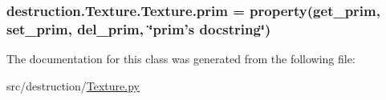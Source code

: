 \hypertarget{classdestruction_1_1_texture_1_1_texture_a5647247acd4010e891e5a0526d1a9fd5}{
\subsubsection[{prim}]{\setlength{\rightskip}{0pt plus 5cm}destruction.\-Texture.\-Texture.\-prim = property({\bf get\-\_\-prim}, {\bf set\-\_\-prim}, {\bf del\-\_\-prim}, \char`\"{}prim's docstring\char`\"{})\hspace{0.3cm}{\ttfamily [static]}}}\label{classdestruction_1_1_texture_1_1_texture_a5647247acd4010e891e5a0526d1a9fd5}


The documentation for this class was generated from the following file\-:\begin{DoxyCompactItemize}
\item 
src/destruction/\hyperlink{_texture_8py}{Texture.\-py}\end{DoxyCompactItemize}
